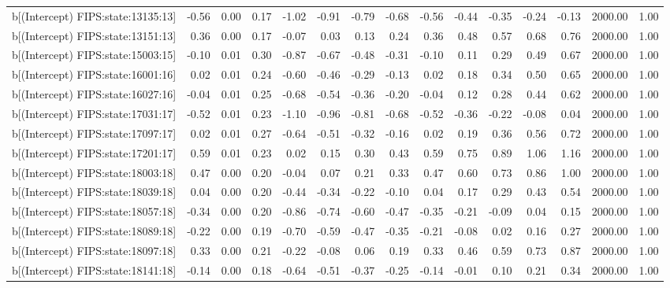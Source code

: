 \begin{table}[ht]
\begin{tabular}{rrrrrrrrrrrrrrr}
  b[(Intercept) FIPS:state:13135:13] & -0.56 & 0.00 & 0.17 & -1.02 & -0.91 & -0.79 & -0.68 & -0.56 & -0.44 & -0.35 & -0.24 & -0.13 & 2000.00 & 1.00 \\ 
  b[(Intercept) FIPS:state:13151:13] & 0.36 & 0.00 & 0.17 & -0.07 & 0.03 & 0.13 & 0.24 & 0.36 & 0.48 & 0.57 & 0.68 & 0.76 & 2000.00 & 1.00 \\ 
  b[(Intercept) FIPS:state:15003:15] & -0.10 & 0.01 & 0.30 & -0.87 & -0.67 & -0.48 & -0.31 & -0.10 & 0.11 & 0.29 & 0.49 & 0.67 & 2000.00 & 1.00 \\ 
  b[(Intercept) FIPS:state:16001:16] & 0.02 & 0.01 & 0.24 & -0.60 & -0.46 & -0.29 & -0.13 & 0.02 & 0.18 & 0.34 & 0.50 & 0.65 & 2000.00 & 1.00 \\ 
  b[(Intercept) FIPS:state:16027:16] & -0.04 & 0.01 & 0.25 & -0.68 & -0.54 & -0.36 & -0.20 & -0.04 & 0.12 & 0.28 & 0.44 & 0.62 & 2000.00 & 1.00 \\ 
  b[(Intercept) FIPS:state:17031:17] & -0.52 & 0.01 & 0.23 & -1.10 & -0.96 & -0.81 & -0.68 & -0.52 & -0.36 & -0.22 & -0.08 & 0.04 & 2000.00 & 1.00 \\ 
  b[(Intercept) FIPS:state:17097:17] & 0.02 & 0.01 & 0.27 & -0.64 & -0.51 & -0.32 & -0.16 & 0.02 & 0.19 & 0.36 & 0.56 & 0.72 & 2000.00 & 1.00 \\ 
  b[(Intercept) FIPS:state:17201:17] & 0.59 & 0.01 & 0.23 & 0.02 & 0.15 & 0.30 & 0.43 & 0.59 & 0.75 & 0.89 & 1.06 & 1.16 & 2000.00 & 1.00 \\ 
  b[(Intercept) FIPS:state:18003:18] & 0.47 & 0.00 & 0.20 & -0.04 & 0.07 & 0.21 & 0.33 & 0.47 & 0.60 & 0.73 & 0.86 & 1.00 & 2000.00 & 1.00 \\ 
  b[(Intercept) FIPS:state:18039:18] & 0.04 & 0.00 & 0.20 & -0.44 & -0.34 & -0.22 & -0.10 & 0.04 & 0.17 & 0.29 & 0.43 & 0.54 & 2000.00 & 1.00 \\ 
  b[(Intercept) FIPS:state:18057:18] & -0.34 & 0.00 & 0.20 & -0.86 & -0.74 & -0.60 & -0.47 & -0.35 & -0.21 & -0.09 & 0.04 & 0.15 & 2000.00 & 1.00 \\ 
  b[(Intercept) FIPS:state:18089:18] & -0.22 & 0.00 & 0.19 & -0.70 & -0.59 & -0.47 & -0.35 & -0.21 & -0.08 & 0.02 & 0.16 & 0.27 & 2000.00 & 1.00 \\ 
  b[(Intercept) FIPS:state:18097:18] & 0.33 & 0.00 & 0.21 & -0.22 & -0.08 & 0.06 & 0.19 & 0.33 & 0.46 & 0.59 & 0.73 & 0.87 & 2000.00 & 1.00 \\ 
  b[(Intercept) FIPS:state:18141:18] & -0.14 & 0.00 & 0.18 & -0.64 & -0.51 & -0.37 & -0.25 & -0.14 & -0.01 & 0.10 & 0.21 & 0.34 & 2000.00 & 1.00 \\ 

\end{tabular}
\end{table}
